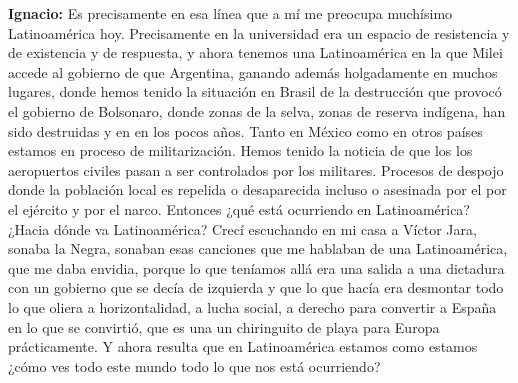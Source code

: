 \documentclass[
]{interact}
\begin{document}
\textbf{Ignacio:} Es precisamente en esa línea que a mí me preocupa
muchísimo Latinoamérica hoy. Precisamente en la universidad era un
espacio de resistencia y de existencia y de respuesta, y ahora tenemos
una Latinoamérica en la que Milei accede al gobierno de que Argentina,
ganando además holgadamente en muchos lugares, donde hemos tenido la
situación en Brasil de la destrucción que provocó el gobierno de
Bolsonaro, donde zonas de la selva, zonas de reserva indígena, han sido
destruidas y en en los pocos años. Tanto en México como en otros países
estamos en proceso de militarización. Hemos tenido la noticia de que los
los aeropuertos civiles pasan a ser controlados por los militares.
Procesos de despojo donde la población local es repelida o desaparecida
incluso o asesinada por el por el ejército y por el narco. Entonces ¿qué
está ocurriendo en Latinoamérica? ¿Hacia dónde va Latinoamérica? Crecí
escuchando en mi casa a Víctor Jara, sonaba la Negra, sonaban esas
canciones que me hablaban de una Latinoamérica, que me daba envidia,
porque lo que teníamos allá era una salida a una dictadura con un
gobierno que se decía de izquierda y que lo que hacía era desmontar todo
lo que oliera a horizontalidad, a lucha social, a derecho para convertir
a España en lo que se convirtió, que es una un chiringuito de playa para
Europa prácticamente. Y ahora resulta que en Latinoamérica estamos como
estamos ¿cómo ves todo este mundo todo lo que nos está ocurriendo?
\end{document}

